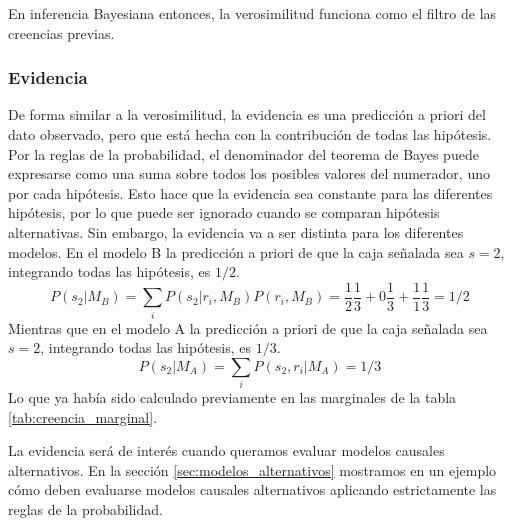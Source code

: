 \documentclass[a4paper,11pt]{book}
\theoremstyle{definition}
\begin{document}

En inferencia Bayesiana entonces, la verosimilitud funciona como el filtro de las creencias previas.

\subsubsection{Evidencia}

De forma similar a la verosimilitud, la evidencia es una predicci\'on a priori del dato observado, pero que est\'a hecha con la contribuci\'on de todas las hip\'otesis.
%
Por la reglas de la probabilidad, el denominador del teorema de Bayes puede expresarse como una suma sobre todos los posibles valores del numerador, uno por cada hip\'otesis.
%
Esto hace que la evidencia sea constante para las diferentes hip\'otesis, por lo que puede ser ignorado cuando se comparan hip\'otesis alternativas.
%
Sin embargo, la evidencia va a ser distinta para los diferentes modelos.
%
En el modelo B la predicci\'on a priori de que la caja se\~nalada sea $s=2$, integrando todas las hip\'otesis, es $1/2$.
%
\begin{equation}
P(s_2|M_B) = \sum_i P(s_2|r_i, M_B) P(r_i, M_B) = \frac{1}{2} \frac{1}{3} + 0 \frac{1}{3} + \frac{1}{1} \frac{1}{3} = 1/2
\end{equation}
%
Mientras que en el modelo A la predicci\'on a priori de que la caja se\~nalada sea $s=2$, integrando todas las hip\'otesis, es $1/3$.
%
\begin{equation}
P(s_2|M_A) = \sum_i P(s_2,r_i| M_A) = 1/3
\end{equation}
%
Lo que ya hab\'ia sido calculado previamente en las marginales de la tabla \ref{tab:creencia_marginal}.


La evidencia ser\'a de inter\'es cuando queramos evaluar modelos causales alternativos.
%
En la secci\'on \ref{sec:modelos_alternativos} mostramos en un ejemplo c\'omo deben evaluarse modelos causales alternativos aplicando estrictamente las reglas de la probabilidad.
\end{document}
